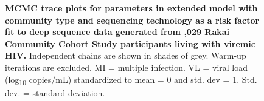 \documentclass[10pt,letterpaper]{article}
\begin{document}
\begin{figure}[!ht]
\caption{{\bf MCMC trace plots for parameters in extended model with community type and sequencing technology as a risk factor fit to deep sequence data generated from ,029 Rakai Community Cohort Study participants living with viremic HIV.} Independent chains are shown in shades of grey. Warm-up iterations are excluded. MI = multiple infection. VL = viral load (log\textsubscript{10} copies/mL) standardized to mean = 0 and std. dev = 1. Std. dev. = standard deviation. }
\end{figure}
\end{document}
